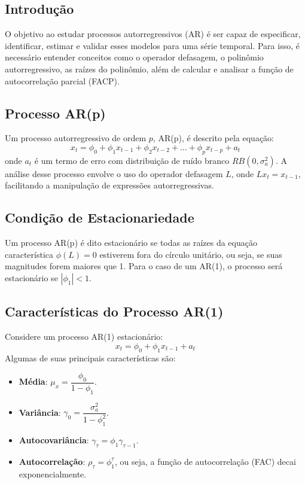 \documentclass{sciposter}
\begin{document}
\begin{multicols}{3}
\subsection{Introdução}
O objetivo ao estudar processos autorregressivos (AR) é ser capaz de especificar, identificar, estimar e validar esses modelos para uma série temporal. Para isso, é necessário entender conceitos como o operador defasagem, o polinômio autorregressivo, as raízes do polinômio, além de calcular e analisar a função de autocorrelação parcial (FACP).

\subsection{Processo AR(p)}
Um processo autorregressivo de ordem $p$, AR(p), é descrito pela equação:
\[
x_t = \phi_0 + \phi_1 x_{t-1} + \phi_2 x_{t-2} + \dots + \phi_p x_{t-p} + a_t
\]
onde $a_t$ é um termo de erro com distribuição de ruído branco $RB(0, \sigma_a^2)$. A análise desse processo envolve o uso do operador defasagem $L$, onde $L x_t = x_{t-1}$, facilitando a manipulação de expressões autorregressivas.

\subsection{Condição de Estacionariedade}
Um processo AR(p) é dito estacionário se todas as raízes da equação característica $\phi(L) = 0$ estiverem fora do círculo unitário, ou seja, se suas magnitudes forem maiores que 1. Para o caso de um AR(1), o processo será estacionário se $|\phi_1| < 1$.

\subsection{Características do Processo AR(1)}
Considere um processo AR(1) estacionário:
\[
x_t = \phi_0 + \phi_1 x_{t-1} + a_t
\]
Algumas de suas principais características são:
\begin{itemize}
    \item \textbf{Média}: $\mu_x = \dfrac{\phi_0}{1 - \phi_1}$.
    \item \textbf{Variância}: $\gamma_0 = \dfrac{\sigma_a^2}{1 - \phi_1^2}$.
    \item \textbf{Autocovariância}: $\gamma_\tau = \phi_1 \gamma_{\tau-1}$.
    \item \textbf{Autocorrelação}: $\rho_\tau = \phi_1^\tau$, ou seja, a função de autocorrelação (FAC) decai exponencialmente.
\end{itemize}


\end{multicols}
\end{document}
